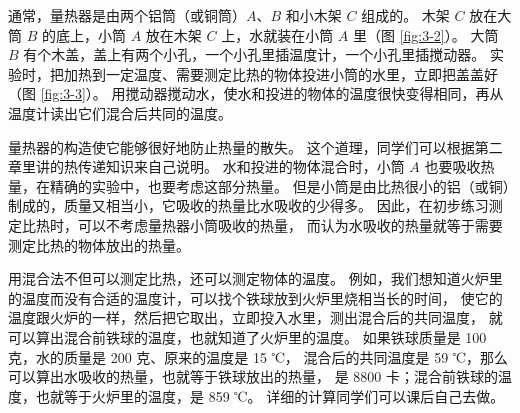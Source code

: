 通常，量热器是由两个铝筒（或铜筒）$A$、$B$ 和小木架 $C$ 组成的。
木架 $C$ 放在大筒 $B$ 的底上，小筒 $A$ 放在木架 $C$ 上，水就装在小筒 $A$ 里（图 \ref{fig:3-2}）。
大筒 $B$ 有个木盖，盖上有两个小孔，一个小孔里插温度计，一个小孔里插搅动器。
实验时，把加热到一定温度、需要测定比热的物体投进小筒的水里，立即把盖盖好（图 \ref{fig:3-3}）。
用搅动器搅动水，使水和投进的物体的温度很快变得相同，再从温度计读出它们混合后共同的温度。

量热器的构造使它能够很好地防止热量的散失。
这个道理，同学们可以根据第二章里讲的热传递知识来自己说明。
水和投进的物体混合时，小筒 $A$ 也要吸收热量，在精确的实验中，也要考虑这部分热量。
但是小筒是由比热很小的铝（或铜）制成的，质量又相当小，它吸收的热量比水吸收的少得多。
因此，在初步练习测定比热时，可以不考虑量热器小筒吸收的热量，
而认为水吸收的热量就等于需要测定比热的物体放出的热量。

用混合法不但可以测定比热，还可以测定物体的温度。
例如，我们想知道火炉里的温度而没有合适的温度计，可以找个铁球放到火炉里烧相当长的时间，
使它的温度跟火炉的一样，然后把它取出，立即投入水里，测出混合后的共同温度，
就可以算出混合前铁球的温度，也就知道了火炉里的温度。
如果铁球质量是 100 克，水的质量是 200 克、原来的温度是 15 ℃，
混合后的共同温度是 59 ℃，那么可以算出水吸收的热量，也就等于铁球放出的热量，
是 8800 卡；混合前铁球的温度，也就等于火炉里的温度，是 859 ℃。
详细的计算同学们可以课后自己去做。

